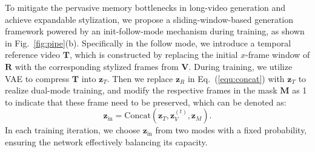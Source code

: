\documentclass[runningheads]{llncs}
\begin{document}

To mitigate the pervasive memory bottlenecks in long-video generation and achieve expandable stylization, we propose a sliding-window-based generation framework powered by an init-follow-mode mechanism during training, as shown in Fig.~\ref{fig:pipe}(b). Specifically in the follow mode, we introduce a temporal reference video $\mathbf{T}$, which is constructed by replacing the initial $x$-frame window of $\mathbf{R}$ with the corresponding stylized frames from $\mathbf{V}$. During training, we utilize VAE to compress $\mathbf{T}$ into $\mathbf{z}_T$. Then we replace $\mathbf{z}_R$ in Eq.~(\ref{equ:concat}) with $\mathbf{z}_T$ to realize dual-mode training, and modify the respective frames in the mask $\mathbf{M}$ as 1 to indicate that these frame need to be preserved, which can be denoted as:
\begin{equation}
    \mathbf{z}_{\text{in}} = \text{Concat}(\mathbf{z}_T, \mathbf{z}_V^{(t)}, \mathbf{z}_M).
\end{equation}
In each training iteration, we choose $\mathbf{z}_{\text{in}}$ from two modes with a fixed probability, ensuring the network effectively balancing its capacity.
\end{document}
